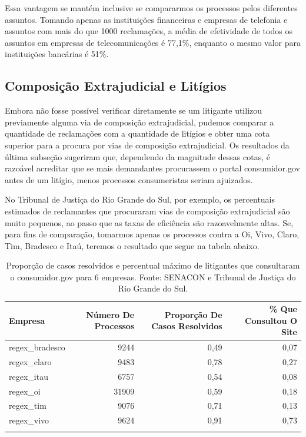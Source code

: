 \documentclass[]{report}
\begin{document}
Essa vantagem se mantém inclusive se compararmos os processos pelos
diferentes assuntos. Tomando apenas as instituições financeiras e
empresas de telefonia e assuntos com mais do que 1000 reclamações, a
média de efetividade de todos os assuntos em empresas de
telecomunicações é 77,1\%, enquanto o mesmo valor para instituições
bancárias é 51\%.

\subsection{Composição Extrajudicial e
Litígios}\label{composicao-extrajudicial-e-litigios}

Embora não fosse possível verificar diretamente se um litigante utilizou
previamente alguma via de composição extrajudicial, pudemos comparar a
quantidade de reclamações com a quantidade de litígios e obter uma cota
superior para a procura por vias de composição extrajudicial. Os
resultados da última subseção sugeriram que, dependendo da magnitude
dessas cotas, é razoável acreditar que se mais demandantes procurassem o
portal consumidor.gov antes de um litígio, menos processos consumeristas
seriam ajuizados.

No Tribunal de Justiça do Rio Grande do Sul, por exemplo, os percentuais
estimados de reclamantes que procuraram vias de composição extrajudicial
são muito pequenos, ao passo que as taxas de eficiência são
razoavelmente altas. Se, para fins de comparação, tomarmos apenas os
processos contra a Oi, Vivo, Claro, Tim, Bradesco e Itaú, teremos o
resultado que segue na tabela abaixo.

\begin{longtable}{lrrr}
\caption{Proporção de casos resolvidos e percentual máximo de litigantes que consultaram o consumidor.gov para 6 empresas. Fonte: SENACON e Tribunal de Justiça do Rio Grande do Sul.} \\
  \hline
Empresa & Número De Processos & Proporção De Casos Resolvidos & \% Que Consultou O Site \\
  \hline
regex\_bradesco & 9244 & 0,49 & 0,07 \\
  regex\_claro & 9483 & 0,78 & 0,27 \\
  regex\_itau & 6757 & 0,54 & 0,08 \\
  regex\_oi & 31909 & 0,59 & 0,18 \\
  regex\_tim & 9076 & 0,71 & 0,13 \\
  regex\_vivo & 9624 & 0,91 & 0,73 \\
   \hline
\hline
\label{contrafactual_senacon}
\end{longtable}
\end{document}

